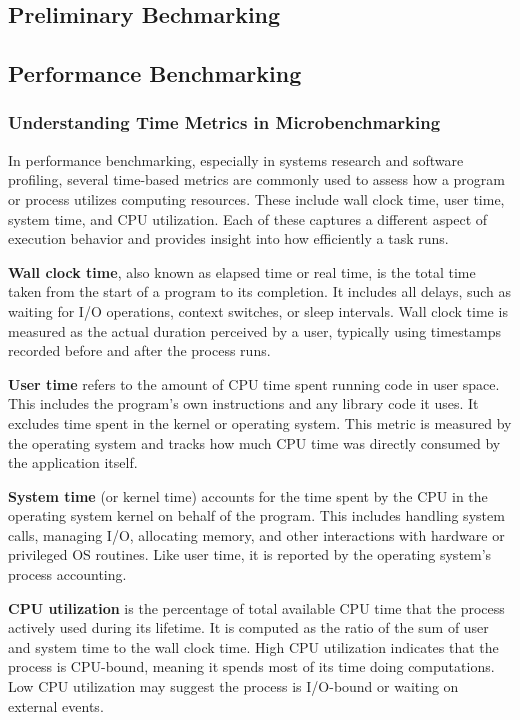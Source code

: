 \documentclass[12pt]{report}
\begin{document}
\begin{doublespace}
\appendix
\chapter{Preliminary Bechmarking}

\section{Performance Benchmarking}

\subsection{Understanding Time Metrics in Microbenchmarking}

In performance benchmarking, especially in systems research and software profiling, several time-based metrics are commonly used to assess how a program or process utilizes computing resources. These include wall clock time, user time, system time, and CPU utilization. Each of these captures a different aspect of execution behavior and provides insight into how efficiently a task runs.

\textbf{Wall clock time}, also known as elapsed time or real time, is the total time taken from the start of a program to its completion. It includes all delays, such as waiting for I/O operations, context switches, or sleep intervals. Wall clock time is measured as the actual duration perceived by a user, typically using timestamps recorded before and after the process runs.

\textbf{User time} refers to the amount of CPU time spent running code in user space. This includes the program’s own instructions and any library code it uses. It excludes time spent in the kernel or operating system. This metric is measured by the operating system and tracks how much CPU time was directly consumed by the application itself.

\textbf{System time} (or kernel time) accounts for the time spent by the CPU in the operating system kernel on behalf of the program. This includes handling system calls, managing I/O, allocating memory, and other interactions with hardware or privileged OS routines. Like user time, it is reported by the operating system’s process accounting.

\textbf{CPU utilization} is the percentage of total available CPU time that the process actively used during its lifetime. It is computed as the ratio of the sum of user and system time to the wall clock time. High CPU utilization indicates that the process is CPU-bound, meaning it spends most of its time doing computations. Low CPU utilization may suggest the process is I/O-bound or waiting on external events.


\end{doublespace}
\end{document}
